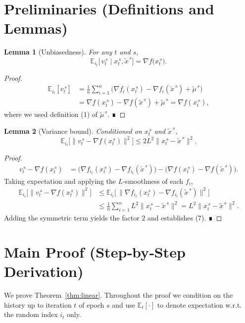 \documentclass{article}
\newtheorem{lemma}{Lemma}
\newcommand{\E}{\mathbb{E}}
\begin{document}
\section*{Preliminaries (Definitions and Lemmas)}
\begin{lemma}[Unbiasedness]\label{lem:unbiased}
For any $t$ and $s$,
\[
\E_{i_t}\!\bigl[\,v_t^{\,s}\mid x_t^{\,s},\tilde x^{\,s}\bigr]=\nabla f\bigl(x_t^{\,s}\bigr).
\]
\end{lemma}
\begin{proof}
\[
\begin{aligned}
\E_{i_t}[v_t^{\,s}]
&=\frac{1}{n}\sum_{i=1}^{n}\bigl(\nabla f_i(x_t^{\,s})-\nabla f_i(\tilde x^{\,s})+\tilde\mu^{\,s}\bigr)\\
&=\nabla f(x_t^{\,s})-\nabla f(\tilde x^{\,s})+\tilde\mu^{\,s}
=\nabla f(x_t^{\,s}),
\end{aligned}
\]
where we used definition (1) of $\tilde\mu^{\,s}$. ∎
\end{proof}

\begin{lemma}[Variance bound]\label{lem:var}
Conditioned on $x_t^{\,s}$ and $\tilde x^{\,s}$,
\[
\E_{i_t}\!\bigl[\|v_t^{\,s}-\nabla f(x_t^{\,s})\|^{2}\bigr]
\le 2L^{2}\|x_t^{\,s}-\tilde x^{\,s}\|^{2}.
\tag{7}
\]
\end{lemma}
\begin{proof}
\[
\begin{aligned}
v_t^{\,s}-\nabla f(x_t^{\,s})
&= \bigl(\nabla f_{i_t}(x_t^{\,s})-\nabla f_{i_t}(\tilde x^{\,s})\bigr)
      -\bigl(\nabla f(x_t^{\,s})-\nabla f(\tilde x^{\,s})\bigr) .
\end{aligned}
\]
Taking expectation and applying the $L$‑smoothness of each $f_i$,
\[
\begin{aligned}
\E_{i_t}\!\bigl[\|v_t^{\,s}-\nabla f(x_t^{\,s})\|^{2}\bigr]
&\le \E_{i_t}\!\bigl[\,\|\nabla f_{i_t}(x_t^{\,s})-\nabla f_{i_t}(\tilde x^{\,s})\|^{2}\bigr] \\[0.2em]
&\le \frac{1}{n}\sum_{i=1}^{n} L^{2}\|x_t^{\,s}-\tilde x^{\,s}\|^{2}
 = L^{2}\|x_t^{\,s}-\tilde x^{\,s}\|^{2}.
\end{aligned}
\]
Adding the symmetric term yields the factor $2$ and establishes (7). ∎
\end{proof}

\section*{Main Proof (Step‑by‑Step Derivation)}
We prove Theorem~\ref{thm:linear}.  Throughout the proof we condition on the history up to iteration $t$ of epoch $s$ and use $\E_t[\cdot]$ to denote expectation w.r.t. the random index $i_t$ only.
\end{document}
